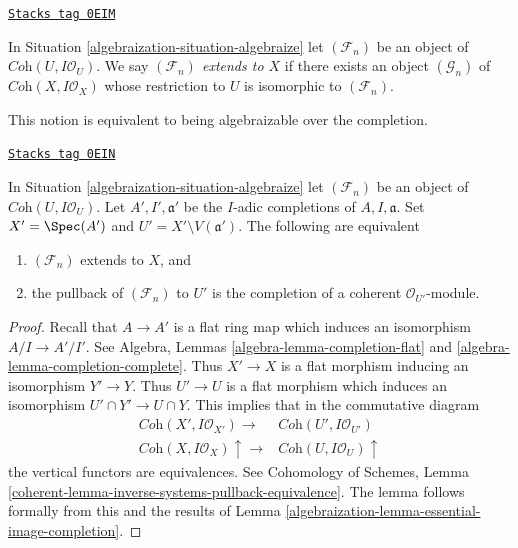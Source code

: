 \begin{definition}[Algebraizable]
\label{algebraization-definition-algebraizable}
\href{https://stacks.math.columbia.edu/tag/0EIM}{\texttt{Stacks tag 0EIM}}

In Situation \ref{algebraization-situation-algebraize} let $(\mathcal{F}_n)$ be an
object of $\textit{Coh}(U, I\mathcal{O}_U)$. We say
{\it $(\mathcal{F}_n)$ extends to $X$} if there exists an object
$(\mathcal{G}_n)$ of $\textit{Coh}(X, I\mathcal{O}_X)$ whose restriction
to $U$ is isomorphic to $(\mathcal{F}_n)$.
\end{definition}

This notion is equivalent to being algebraizable over the completion.

\begin{lemma}[Algebraizable]
\label{algebraization-lemma-algebraizable}
\href{https://stacks.math.columbia.edu/tag/0EIN}{\texttt{Stacks tag 0EIN}}

In Situation \ref{algebraization-situation-algebraize} let $(\mathcal{F}_n)$ be an
object of $\textit{Coh}(U, I\mathcal{O}_U)$. Let $A', I', \mathfrak a'$
be the $I$-adic completions of $A, I, \mathfrak a$. Set $X' = \Spec(A')$
and $U' = X' \setminus V(\mathfrak a')$. The following are equivalent
\begin{enumerate}
\item $(\mathcal{F}_n)$ extends to $X$, and
\item the pullback of $(\mathcal{F}_n)$ to $U'$ is the completion
of a coherent $\mathcal{O}_{U'}$-module.
\end{enumerate}
\end{lemma}

\begin{proof}

Recall that $A \to A'$ is a flat ring map which induces an isomorphism
$A/I \to A'/I'$. See
Algebra, Lemmas \ref{algebra-lemma-completion-flat} and
\ref{algebra-lemma-completion-complete}.
Thus $X' \to X$ is a
flat morphism inducing an isomorphism $Y' \to Y$. Thus $U' \to U$
is a flat morphism which induces an isomorphism $U' \cap Y' \to U \cap Y$.
This implies that in the commutative diagram
$$
\begin{array}{cc}\textit{Coh}(X', I\mathcal{O}_{X'}) \longrightarrow & \textit{Coh}(U', I\mathcal{O}_{U'}) \\ \textit{Coh}(X, I\mathcal{O}_X) \uparrow\longrightarrow & \textit{Coh}(U, I\mathcal{O}_U) \uparrow\end{array}
$$
the vertical functors are equivalences. See
Cohomology of Schemes, Lemma
\ref{coherent-lemma-inverse-systems-pullback-equivalence}.
The lemma follows formally from this and the results of
Lemma \ref{algebraization-lemma-essential-image-completion}.
\end{proof}


